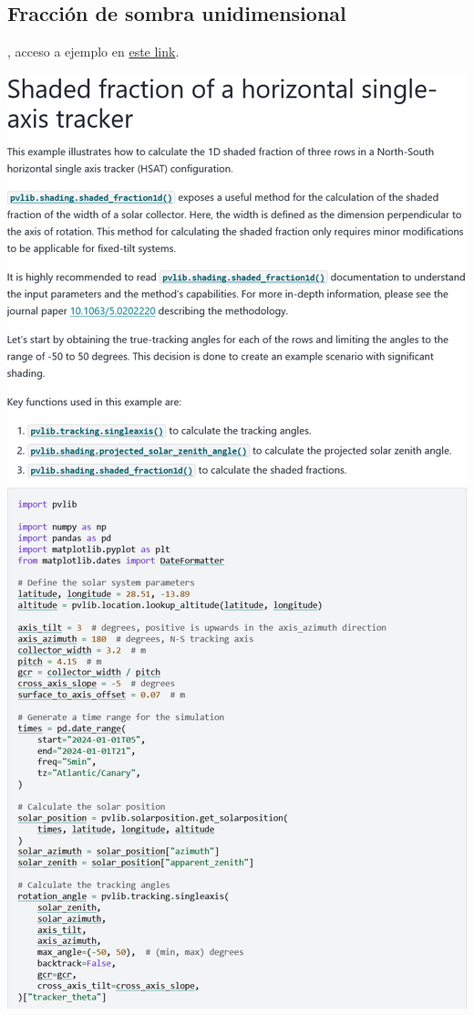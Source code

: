 \begin{myparindent}{0pt}
\newpage\section{Fracción de sombra unidimensional} \label{sct:doc_ej_fraccion_sombra}

, acceso a ejemplo en \href{https://pvlib-python.readthedocs.io/en/stable/gallery/shading/plot_shaded_fraction1d_ns_hsat_example.html}{este link}.

\includegraphics[width=\linewidth,height=0.9\textheight,keepaspectratio]{images/docs_examples_cut/shaded_fraction_0.png}


\end{myparindent}
